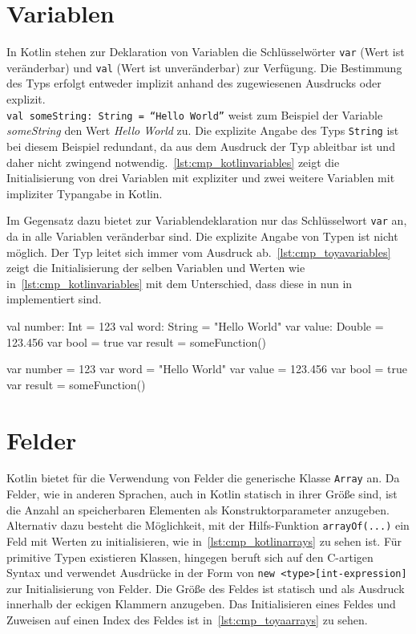 \section{Variablen}

In Kotlin stehen zur Deklaration von Variablen die Schlüsselwörter \texttt{var} (Wert ist veränderbar) und \texttt{val} (Wert ist unveränderbar) zur Verfügung. Die Bestimmung des Typs erfolgt entweder implizit anhand des zugewiesenen Ausdrucks oder explizit.\\ \texttt{val someString: String = ``Hello World''} weist zum Beispiel der Variable \textit{someString} den Wert \textit{Hello World} zu. Die explizite Angabe des Typs \texttt{String} ist bei diesem Beispiel redundant, da aus dem Ausdruck der Typ ableitbar ist und daher nicht zwingend notwendig.~\autoref{lst:cmp_kotlinvariables} zeigt die Initialisierung von drei Variablen mit expliziter und zwei weitere Variablen mit impliziter Typangabe in Kotlin.

Im Gegensatz dazu bietet \toya zur Variablendeklaration nur das Schlüsselwort \texttt{var} an, da in \toya alle Variablen veränderbar sind. Die explizite Angabe von Typen ist nicht möglich. Der Typ leitet sich immer vom Ausdruck ab.~\autoref{lst:cmp_toyavariables} zeigt die Initialisierung der selben Variablen und Werten wie in~\autoref{lst:cmp_kotlinvariables} mit dem Unterschied, dass diese in nun in \toya implementiert sind.

\begin{KotlinCode}[numbers=none, caption={Variablendeklarationen in Kotlin}, label=lst:cmp_kotlinvariables]
val number: Int = 123
val word: String = "Hello World"
var value: Double = 123.456
var bool = true
var result = someFunction()
\end{KotlinCode}

\begin{ToyaCode}[numbers=none, caption={Variablendeklarationen in \toya}, label=lst:cmp_toyavariables]
var number = 123
var word = "Hello World"
var value = 123.456
var bool = true
var result = someFunction()
\end{ToyaCode}

\section{Felder}

Kotlin bietet für die Verwendung von Felder die generische Klasse \texttt{Array} an. Da Felder, wie in anderen Sprachen, auch in Kotlin statisch in ihrer Größe sind, ist die Anzahl an speicherbaren Elementen als Konstruktorparameter anzugeben. Alternativ dazu besteht die Möglichkeit, mit der Hilfs-Funktion \texttt{arrayOf(...)} ein Feld mit Werten zu initialisieren, wie in~\autoref{lst:cmp_kotlinarrays} zu sehen ist. Für primitive Typen existieren Klassen, \toya hingegen beruft sich auf den C-artigen Syntax und verwendet Ausdrücke in der Form von \texttt{new <type>[int-expression]} zur Initialisierung von Felder. Die Größe des Feldes ist statisch und als Ausdruck innerhalb der eckigen Klammern anzugeben. Das Initialisieren eines Feldes und Zuweisen auf einen Index des Feldes ist in~\autoref{lst:cmp_toyaarrays} zu sehen.

